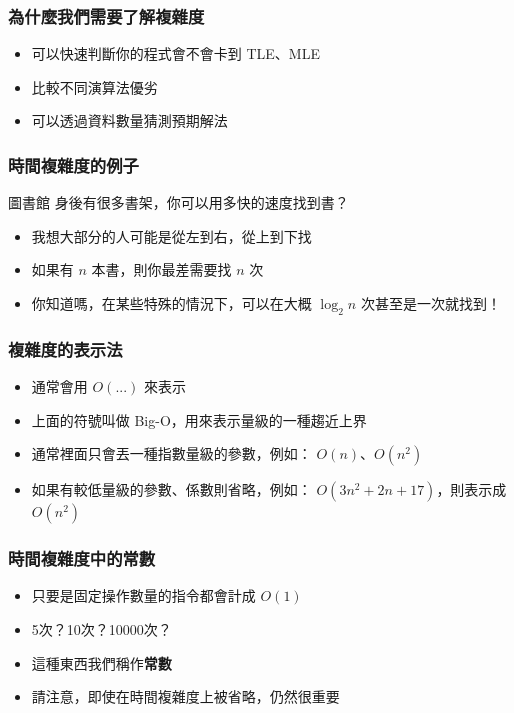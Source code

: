 \documentclass{beamer}
\begin{document}
\begin{frame}
    \frametitle{為什麼我們需要了解複雜度}
    \begin{itemize}
        \item 可以快速判斷你的程式會不會卡到 TLE、MLE
        \item 比較不同演算法優劣
        \item 可以透過資料數量猜測預期解法
    \end{itemize}
\end{frame}

\begin{frame}
    \frametitle{時間複雜度的例子}
    \begin{block}{圖書館}
        身後有很多書架，你可以用多快的速度找到書？
    \end{block}
    \begin{itemize}
        \item<2-> 我想大部分的人可能是從左到右，從上到下找
        \item<2-> 如果有 $n$ 本書，則你最差需要找 $n$ 次
        \item<3-> 你知道嗎，在某些特殊的情況下，可以在大概 $\log_2{n}$ 次甚至是一次就找到！
    \end{itemize}
\end{frame}

\begin{frame}
    \frametitle{複雜度的表示法}
    \begin{itemize}
        \item 通常會用 $O(...)$ 來表示
        \item 上面的符號叫做 Big-O，用來表示量級的一種趨近上界
        \item<2-> 通常裡面只會丟一種指數量級的參數，例如： $O(n)$、$O(n^2)$
        \item<2-> 如果有較低量級的參數、係數則省略，例如： $O(3n^2+2n+17)$，則表示成 $O(n^2)$
    \end{itemize}
\end{frame}

\begin{frame}
    \frametitle{時間複雜度中的常數}
    \begin{itemize}
        \item 只要是固定操作數量的指令都會計成 $O(1)$
        \item 5次？10次？10000次？
        \item<2-> 這種東西我們稱作\textbf{常數}
        \item<2-> 請注意，即使在時間複雜度上被省略，仍然很重要
    \end{itemize}
\end{frame}
\end{document}
